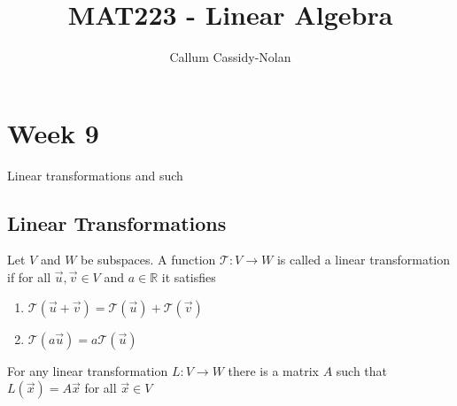 \documentclass[11pt]{book}
\title{MAT223 - Linear Algebra}
\author{Callum Cassidy-Nolan}
\begin{document}


\chapter{Week 9}%
\label{chp:week_9}

Linear transformations and such

\section{Linear Transformations}%
\label{sec:linear_transformations}

\begin{defn}\label{defn:linear_transformation}
    Let $V$ and $W$ be subspaces. A function $\mathcal{T} : V \to W $ is called
    a linear transformation if for all $\vec{u}, \vec{v} \in V$ and $a \in \mathbb{R}$ it satisfies
    \begin{enumerate}
        \item $\mathcal{T}(\vec{u} + \vec{v}) = \mathcal{T}(\vec{u}) + \mathcal{T}(\vec{v})$ 
        \item $\mathcal{T}(a \vec{u}) = a \mathcal{T}(\vec{u})$ 
    \end{enumerate}
\end{defn}


\begin{thm}\label{thm:unique_matrix_for_lt_s}
    For any linear transformation $L : V \to W $ there is a matrix $A$  such that $L\left(\vec{x}\right) = A\vec{x}$ for all $\vec{x} \in V$ 
\end{thm}
\end{document}
